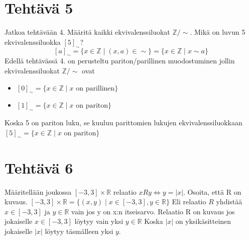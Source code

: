 \documentclass{article}
\begin{document}
        \newpage
        \section*{Tehtävä 5}
        Jatkoa tehtävään 4. Määritä kaikki ekvivalenssiluokat $\mathbb{Z}/\sim$. Mikä on luvun 5 ekvivalenssiluokka $[5]_\sim$?
        \[
            [a]_\sim = \{ x\in \mathbb{Z} \mid (x, a) \in \sim\} = \{x \in \mathbb{Z} \mid x\sim a \}
        \]
        Edellä tehtävässä 4. on perusteltu pariton/parillinen muodostuminen jollin ekvivalenssiluokat $\mathbb{Z}/\sim$ ovat
        \begin{itemize}
        \item
                $[0]_\sim = \{ x \in \mathbb{Z} \mid x \text{ on parillinen} \}$
        \item
                $[1]_\sim = \{ x \in \mathbb{Z} \mid x \text{ on pariton} \}$
        \end{itemize}
        Koska  5  on pariton luku, se kuuluu parittomien lukujen ekvivalenssiluokkaan\newline
        $[5]_\sim = \{ x \in \mathbb{Z} \mid x \text{ on pariton} \}$


        \newpage
        \section*{Tehtävä 6}
        Määritellään joukossa $[-3, 3] \times \mathbb{R}$ relaatio $xRy \Longleftrightarrow  y = |x|$. Osoita, että R on kuvaus.\newline
        \linebreak
        $[-3, 3] \times \mathbb{R} = \{(x,y) \mid x \in [-3,3], y \in \mathbb{R} \}$ Eli relaatio $R$ yhdistää $x \in [-3,3]$ ja $y \in \mathbb{R}$ vain jos y on x:n itseisarvo. \newline
        Relaatio R on kuvaus jos jokaiselle $x \in [-3,3]$ löytyy vain yksi $y \in \mathbb{R}$\newline
        \linebreak
        Koska $|x|$ on yksikäsitteinen jokaiselle $|x|$ löytyy täsmälleen yksi $y$.
        \linebreak
\end{document}
